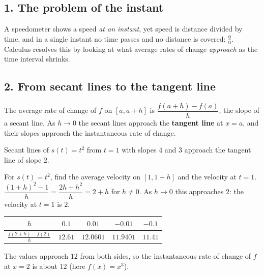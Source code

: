 \subsection*{1. The problem of the instant}
A speedometer shows a speed \emph{at an instant}, yet speed is distance divided by time, and in a single instant no time passes and no distance is covered: $\frac00$. Calculus resolves this by looking at what average rates of change \emph{approach} as the time interval shrinks.

\subsection*{2. From secant lines to the tangent line}
The average rate of change of $f$ on $[a,a+h]$ is $\dfrac{f(a+h)-f(a)}{h}$, the slope of a secant line. As $h\to0$ the secant lines approach the \textbf{tangent line} at $x=a$, and their slopes approach the instantaneous rate of change.

\begin{center}

{\small Secant lines of $s(t)=t^2$ from $t=1$ with slopes $4$ and $3$ approach the tangent line of slope $2$.}
\end{center}

\begin{example}
For $s(t)=t^2$, find the average velocity on $[1,1+h]$ and the velocity at $t=1$.
\sol $\dfrac{(1+h)^2-1}{h}=\dfrac{2h+h^2}{h}=2+h$ for $h\neq0$. As $h\to0$ this approaches $2$: the velocity at $t=1$ is $2$.
\end{example}

\begin{example}
\begin{center}\begin{tabular}{c|cccc}$h$&$0.1$&$0.01$&$-0.01$&$-0.1$\\\hline$\frac{f(2+h)-f(2)}{h}$&$12.61$&$12.0601$&$11.9401$&$11.41$\end{tabular}\end{center}
\sol The values approach $12$ from both sides, so the instantaneous rate of change of $f$ at $x=2$ is about $12$ (here $f(x)=x^3$).
\end{example}

